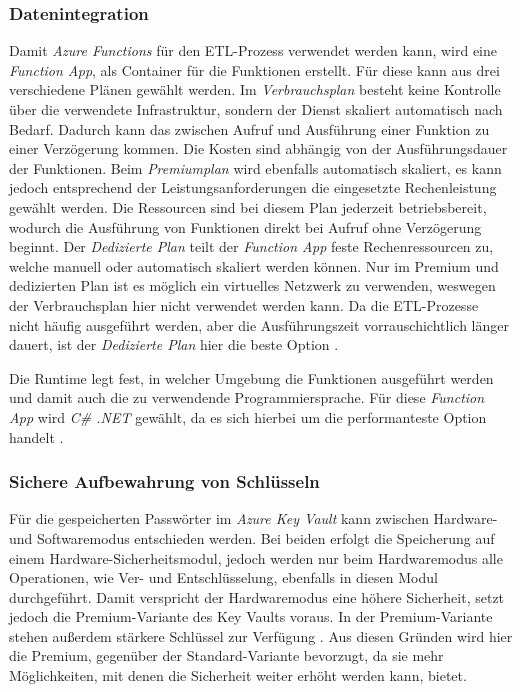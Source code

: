 \subsubsection{Datenintegration} \label{subsec:umsetzen:konfiguration:functions}
Damit \textit{Azure Functions} für den ETL-Prozess verwendet werden kann, wird eine \textit{Function App}, als Container für die Funktionen erstellt. Für diese kann aus drei verschiedene Plänen gewählt werden. Im \textit{Verbrauchsplan} besteht keine Kontrolle über die verwendete Infrastruktur, sondern der Dienst skaliert automatisch nach Bedarf. Dadurch kann das zwischen Aufruf und Ausführung einer Funktion zu einer Verzögerung kommen. Die Kosten sind abhängig von der Ausführungsdauer der Funktionen. Beim \textit{Premiumplan} wird ebenfalls automatisch skaliert, es kann jedoch entsprechend der Leistungsanforderungen die eingesetzte Rechenleistung gewählt werden. Die Ressourcen sind bei diesem Plan jederzeit betriebsbereit, wodurch die Ausführung von Funktionen direkt bei Aufruf ohne Verzögerung beginnt. Der \textit{Dedizierte Plan} teilt der \textit{Function App} feste Rechenressourcen zu, welche manuell oder automatisch skaliert werden können. Nur im Premium und dedizierten Plan ist es möglich ein virtuelles Netzwerk zu verwenden, weswegen der Verbrauchsplan hier nicht verwendet werden kann. Da die ETL-Prozesse nicht häufig ausgeführt werden, aber die Ausführungszeit vorrauschichtlich länger dauert, ist der \textit{Dedizierte Plan} hier die beste Option \cite[vgl.][]{satapathi_hands-azure_2021}.

Die Runtime legt fest, in welcher Umgebung die Funktionen ausgeführt werden und damit auch die zu verwendende Programmiersprache. Für diese \textit{Function App} wird \textit{C\# .NET} gewählt, da es sich hierbei um die performanteste Option handelt \cite[vgl.][]{jackson_investigation_2018}.

\subsubsection{Sichere Aufbewahrung von Schlüsseln} \label{subsec:umsetzen:konfiguration:keyVault}
Für die gespeicherten Passwörter im \textit{Azure Key Vault} kann zwischen Hardware- und Softwaremodus entschieden werden. Bei beiden erfolgt die Speicherung auf einem Hardware-Sicherheitsmodul, jedoch werden nur beim Hardwaremodus alle Operationen, wie Ver- und Entschlüsselung, ebenfalls in diesen Modul durchgeführt. Damit verspricht der Hardwaremodus eine höhere Sicherheit, setzt jedoch die Premium-Variante des Key Vaults voraus. In der Premium-Variante stehen außerdem stärkere Schlüssel zur Verfügung \cite{haunts_key_2019}. Aus diesen Gründen wird hier die Premium, gegenüber der Standard-Variante bevorzugt, da sie mehr Möglichkeiten, mit denen die Sicherheit weiter erhöht werden kann, bietet.

